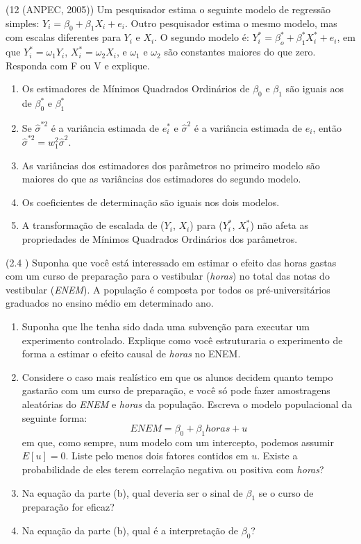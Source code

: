 \documentclass[12pt,letterpaper, onecolumn]{exam}
\begin{document}
\begin{questions}
\question (12 (ANPEC, 2005)) Um pesquisador estima o seguinte modelo de regressão simples: $Y_i = \beta_0 + \beta_1X_i + e_i$. Outro pesquisador estima o mesmo modelo, mas com escalas diferentes para $Y_i$ e $X_i$. O segundo modelo é: $Y^*_i = \beta_o^* + \beta_1^*X^*_i + e_i$, em que $Y^*_i = \omega_1Y_i$, $X^*_i = \omega_2X_i$, e $\omega_1$ e $\omega_2$ são constantes maiores do que zero. Responda com F ou V e explique.
\begin{enumerate}[label=(\arabic*), start=0]
    \item Os estimadores de Mínimos Quadrados Ordinários de $\beta_0$ e $\beta_1$ são iguais aos de $\beta_0^*$ e $\beta_1^*$
    \item Se $\hat \sigma^{*2}$ é a variância estimada de $e^*_i$ e $\hat \sigma^2$ é a variância estimada de $e_i$, então $\hat\sigma^{*2} = w^2_1\hat\sigma^2$.
    \item As variâncias dos estimadores dos parâmetros no primeiro modelo são maiores do que as variâncias dos estimadores do segundo modelo.
    \item Os coeficientes de determinação são iguais nos dois modelos.
    \item A transformação de escalada de ($Y_i$, $X_i$) para ($Y_i^*$, $X_i^*$) não afeta as propriedades de Mínimos Quadrados Ordinários dos parâmetros.
\end{enumerate}


\question (2.4 \citep{wooldridge2010}) Suponha que você está interessado em estimar o efeito das horas gastas com um curso de preparação para o vestibular (\textit{horas}) no total das notas do vestibular (\textit{ENEM}). A população é composta por todos os pré-universitários graduados no ensino médio em determinado ano.
    \begin{enumerate} [label = (\alph*)]
\item Suponha que lhe tenha sido dada uma subvenção para executar um experimento controlado. Explique como você estruturaria o experimento de forma a estimar o efeito causal de \textit{horas} no ENEM.
\item Considere o caso mais realístico em que os alunos decidem quanto tempo gastarão com um curso de preparação, e você só pode fazer amostragens aleatórias do \textit{ENEM} e \textit{horas} da população. Escreva o modelo populacional da seguinte forma:\begin{equation*}
    ENEM = \beta_0 + \beta_1 horas + u
\end{equation*} em que, como sempre, num modelo com um intercepto, podemos assumir $E[u] = 0$. Liste pelo menos dois fatores contidos em $u$. Existe a probabilidade de eles terem correlação negativa ou positiva com \textit{horas}?
\item Na equação da parte (b), qual deveria ser o sinal de $\beta_1$ se o curso de preparação for eficaz?
\item Na equação da parte (b), qual é a interpretação de $\beta_0$?
    \end{enumerate}
    
\end{questions}

\end{document}
